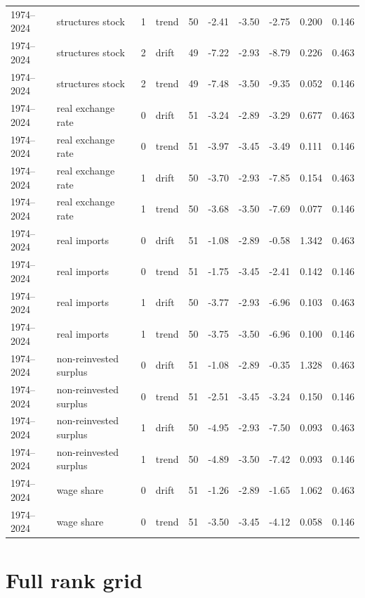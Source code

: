 \documentclass[11pt]{article}
\begin{document}
\begin{longtable}{p{1.6cm}p{3.4cm}p{0.6cm}p{1.1cm}p{0.6cm}rrrrr}
1974--2024 & structures stock & 1 & trend & 50 & -2.41 & -3.50 & -2.75 & 0.200 & 0.146 \\
1974--2024 & structures stock & 2 & drift & 49 & -7.22 & -2.93 & -8.79 & 0.226 & 0.463 \\
1974--2024 & structures stock & 2 & trend & 49 & -7.48 & -3.50 & -9.35 & 0.052 & 0.146 \\
1974--2024 & real exchange rate & 0 & drift & 51 & -3.24 & -2.89 & -3.29 & 0.677 & 0.463 \\
1974--2024 & real exchange rate & 0 & trend & 51 & -3.97 & -3.45 & -3.49 & 0.111 & 0.146 \\
1974--2024 & real exchange rate & 1 & drift & 50 & -3.70 & -2.93 & -7.85 & 0.154 & 0.463 \\
1974--2024 & real exchange rate & 1 & trend & 50 & -3.68 & -3.50 & -7.69 & 0.077 & 0.146 \\
1974--2024 & real imports & 0 & drift & 51 & -1.08 & -2.89 & -0.58 & 1.342 & 0.463 \\
1974--2024 & real imports & 0 & trend & 51 & -1.75 & -3.45 & -2.41 & 0.142 & 0.146 \\
1974--2024 & real imports & 1 & drift & 50 & -3.77 & -2.93 & -6.96 & 0.103 & 0.463 \\
1974--2024 & real imports & 1 & trend & 50 & -3.75 & -3.50 & -6.96 & 0.100 & 0.146 \\
1974--2024 & non-reinvested surplus & 0 & drift & 51 & -1.08 & -2.89 & -0.35 & 1.328 & 0.463 \\
1974--2024 & non-reinvested surplus & 0 & trend & 51 & -2.51 & -3.45 & -3.24 & 0.150 & 0.146 \\
1974--2024 & non-reinvested surplus & 1 & drift & 50 & -4.95 & -2.93 & -7.50 & 0.093 & 0.463 \\
1974--2024 & non-reinvested surplus & 1 & trend & 50 & -4.89 & -3.50 & -7.42 & 0.093 & 0.146 \\
1974--2024 & wage share & 0 & drift & 51 & -1.26 & -2.89 & -1.65 & 1.062 & 0.463 \\
1974--2024 & wage share & 0 & trend & 51 & -3.50 & -3.45 & -4.12 & 0.058 & 0.146 \\
\bottomrule
\end{longtable}
\normalsize

\section{Full rank grid}
\end{document}
